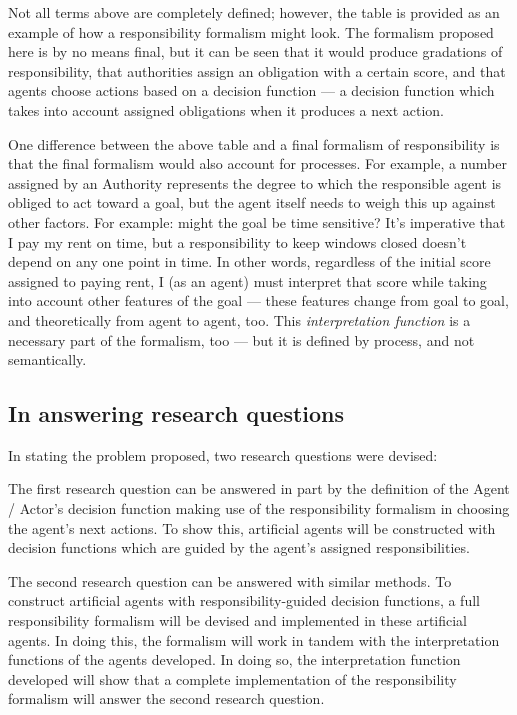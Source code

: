 Not all terms above are completely defined; however, the table is provided as an example of how a responsibility formalism might look. The formalism proposed here is by no means final, but it can be seen that it would produce gradations of responsibility, that authorities assign an obligation with a certain score, and that agents choose actions based on a decision function --- a decision function which takes into account assigned obligations when it produces a next action.\par

One difference between the above table and a final formalism of responsibility is that the final formalism would also account for processes. For example, a number assigned by an Authority represents the degree to which the responsible agent is obliged to act toward a goal, but the agent itself needs to weigh this up against other factors. For example: might the goal be time sensitive? It's imperative that I pay my rent on time, but a responsibility to keep windows closed doesn't depend on any one point in time. In other words, regardless of the initial score assigned to paying rent, I (as an agent) must interpret that score while taking into account other features of the goal --- these features change from goal to goal, and theoretically from agent to agent, too. This \emph{interpretation function} is a necessary part of the formalism, too --- but it is defined by process, and not semantically.\par

\subsection{In answering research questions}
In stating the problem proposed, two research questions were devised:

The first research question can be answered in part by the definition of the Agent / Actor's decision function making use of the responsibility formalism in choosing the agent's next actions. To show this, artificial agents will be constructed with decision functions which are guided by the agent's assigned responsibilities.\par

The second research question can be answered with similar methods. To construct artificial agents with responsibility-guided decision functions, a full responsibility formalism will be devised and implemented in these artificial agents. In doing this, the formalism will work in tandem with the interpretation functions of the agents developed. In doing so, the interpretation function developed will show that a complete implementation of the responsibility formalism will answer the second research question.\par

